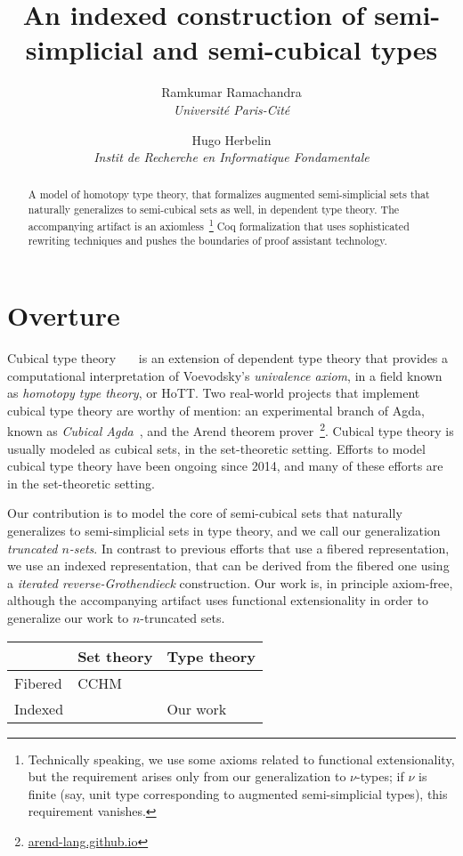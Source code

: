 \documentclass[10pt]{art}
\title{An indexed construction of semi-simplicial and semi-cubical types}
\author{
  \textcolor{gray80}{Ramkumar Ramachandra} \\
  \itshape \textcolor{gray80}{Université Paris-Cité}
  \and
  \textcolor{gray80}{Hugo Herbelin} \\
  \itshape \textcolor{gray80}{Instit de Recherche en Informatique Fondamentale}
}
\date{}
\begin{document}
\thispagestyle{empty}
\maketitle
\begin{abstract}
  A model of homotopy type theory, that formalizes augmented semi-simplicial sets that naturally generalizes to semi-cubical sets as well, in dependent type theory. The accompanying artifact is an axiomless~\footnote{Technically speaking, we use some axioms related to functional extensionality, but the requirement arises only from our generalization to $\nu$-types; if $\nu$ is finite (say, unit type corresponding to augmented semi-simplicial types), this requirement vanishes.} Coq formalization that uses sophisticated rewriting techniques and pushes the boundaries of proof assistant technology.
\end{abstract}
\tableofcontents
\newpage

\section{Overture}
Cubical type theory~\cite{Bezem14}~\cite{Cohen16}~\cite{Angiuli17} is an extension of dependent type theory that provides a computational interpretation of Voevodsky's \emph{univalence axiom}, in a field known as \emph{homotopy type theory}, or HoTT. Two real-world projects that implement cubical type theory are worthy of mention: an experimental branch of Agda, known as \emph{Cubical Agda}~\cite{Vezzosi21}, and the Arend theorem prover~\footnote{\href{https://arend-lang.github.io}{arend-lang.github.io}}. Cubical type theory is usually modeled as cubical sets, in the set-theoretic setting. Efforts to model cubical type theory have been ongoing since 2014, and many of these efforts are in the set-theoretic setting.

Our contribution is to model the core of semi-cubical sets that naturally generalizes to semi-simplicial sets in type theory, and we call our generalization \emph{truncated $n$-sets}. In contrast to previous efforts that use a fibered representation, we use an indexed representation, that can be derived from the fibered one using a \emph{iterated reverse-Grothendieck} construction. Our work is, in principle axiom-free, although the accompanying artifact uses functional extensionality in order to generalize our work to $n$-truncated sets.

\begin{table}[H]
  \begin{tabularx}{\linewidth}{p{.3\linewidth}|p{.3\linewidth}|p{.3\linewidth}}
    \toprule
            & Set theory & Type theory \\
    \midrule
    Fibered & CCHM       &             \\
    \midrule
    Indexed &            & Our work    \\
    \bottomrule
  \end{tabularx}
\end{table}
\end{document}
